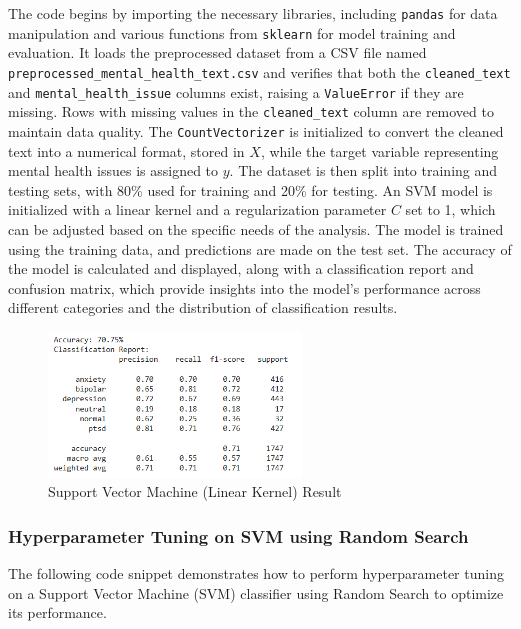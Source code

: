 \noindent
The code begins by importing the necessary libraries, including \texttt{pandas} for data manipulation and various functions from \texttt{sklearn} for model training and evaluation. It loads the preprocessed dataset from a CSV file named \newline \texttt{preprocessed\_mental\_health\_text.csv} and verifies that both the \texttt{cleaned\_text} and \texttt{mental\_health\_issue} columns exist, raising a \texttt{ValueError} if they are missing. Rows with missing values in the \texttt{cleaned\_text} column are removed to maintain data quality. The \texttt{CountVectorizer} is initialized to convert the cleaned text into a numerical format, stored in \(X\), while the target variable representing mental health issues is assigned to \(y\). The dataset is then split into training and testing sets, with 80\% used for training and 20\% for testing. An SVM model is initialized with a linear kernel and a regularization parameter \(C\) set to 1, which can be adjusted based on the specific needs of the analysis. The model is trained using the training data, and predictions are made on the test set. The accuracy of the model is calculated and displayed, along with a classification report and confusion matrix, which provide insights into the model's performance across different categories and the distribution of classification results.

\begin{figure}[h!]  
    \centering
    \includegraphics[width=0.6\textwidth]{Images/Output SVM.png}  
    \caption{Support Vector Machine (Linear Kernel) Result}
    \label{SVM}  %
\end{figure}

\subsubsection{Hyperparameter Tuning on SVM using Random Search}
\noindent
The following code snippet demonstrates how to perform hyperparameter tuning on a Support Vector Machine (SVM) classifier using Random Search to optimize its performance.

